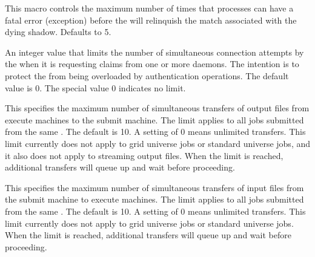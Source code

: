 \begin{description}
\label{param:MaxShadowExceptions}
\item[\Macro{MAX\_SHADOW\_EXCEPTIONS}]
  This macro controls the maximum
  number of times that  processes can have a fatal
  error (exception) before the  will relinquish
  the match associated with the dying shadow.  Defaults to 5.

\label{param:MaxPendingStartdContacts}
\item[\Macro{MAX\_PENDING\_STARTD\_CONTACTS}]
  An integer value that limits
  the number of simultaneous connection attempts by the 
  when it is requesting claims from one or more  daemons.
  The intention is to protect the  from being overloaded
  by authentication operations.  The default value is 0.
  The special value 0 indicates no limit.

\label{param:MaxConcurrentDownloads}
\item[\Macro{MAX\_CONCURRENT\_DOWNLOADS}]
  This specifies the maximum
  number of simultaneous transfers of output files from execute
  machines to the submit machine.  The limit applies to all jobs
  submitted from the same .  The default is 10.  A
  setting of 0 means unlimited transfers.  This limit currently does
  not apply to grid universe jobs or standard universe jobs, and it
  also does not apply to streaming output files.  When the limit is
  reached, additional transfers will queue up and wait before
  proceeding.

\label{param:MaxConcurrentUploads}
\item[\Macro{MAX\_CONCURRENT\_UPLOADS}]
  This specifies the maximum
  number of simultaneous transfers of input files from the submit
  machine to execute machines.  The limit applies to all jobs
  submitted from the same .  The default is 10.  A
  setting of 0 means unlimited transfers.  This limit currently does
  not apply to grid universe jobs or standard universe jobs.  When the
  limit is reached, additional transfers will queue up and wait before
  proceeding.


\end{description}
